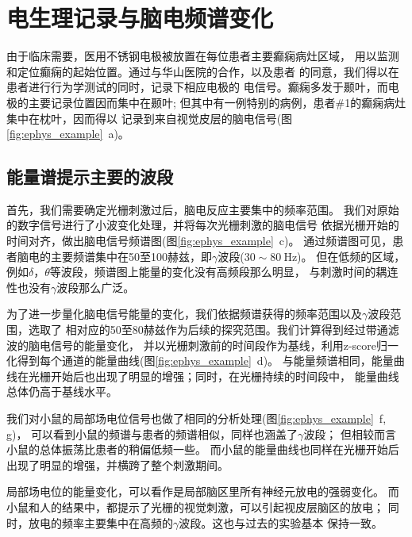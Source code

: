 
\section{电生理记录与脑电频谱变化}
由于临床需要，医用不锈钢电极被放置在每位患者主要癫痫病灶区域，
用以监测和定位癫痫的起始位置。通过与华山医院的合作，以及患者
的同意，我们得以在患者进行行为学测试的同时，记录下相应电极的
电信号。癫痫多发于颞叶，而电极的主要记录位置因而集中在颞叶;
但其中有一例特别的病例，患者\#1的癫痫病灶集中在枕叶，因而得以
记录到来自视觉皮层的脑电信号(图\ref{fig:ephys_example}~a)。

\subsection{能量谱提示主要的波段}
首先，我们需要确定光栅刺激过后，脑电反应主要集中的频率范围。
我们对原始的数字信号进行了小波变化处理，并将每次光栅刺激的脑电信号
依据光栅开始的时间对齐，做出脑电信号频谱图(图\ref{fig:ephys_example}~c)。
通过频谱图可见，患者脑电的主要频谱集中在50至100赫兹，即\(\gamma\)波段(\(30 \sim 80\ \text{Hz}\))。
但在低频的区域，例如\(\delta\)，\(\theta\)等波段，频谱图上能量的变化没有高频段那么明显，
与刺激时间的耦连性也没有\(\gamma\)波段那么广泛。

为了进一步量化脑电信号能量的变化，我们依据频谱获得的频率范围以及\(\gamma\)波段范围，选取了
相对应的50至80赫兹作为后续的探究范围。我们计算得到经过带通滤波的脑电信号的能量变化，
并以光栅刺激前的时间段作为基线，利用z-score归一化得到每个通道的能量曲线(图\ref{fig:ephys_example}~d)。
与能量频谱相同，能量曲线在光栅开始后也出现了明显的增强；同时，在光栅持续的时间段中，
能量曲线总体仍高于基线水平。

我们对小鼠的局部场电位信号也做了相同的分析处理(图\ref{fig:ephys_example}~f, g)，
可以看到小鼠的频谱与患者的频谱相似，同样也涵盖了\(\gamma\)波段；
但相较而言小鼠的总体振荡比患者的稍偏低频一些。
而小鼠的能量曲线也同样在光栅开始后出现了明显的增强，并横跨了整个刺激期间。

局部场电位的能量变化，可以看作是局部脑区里所有神经元放电的强弱变化。
而小鼠和人的结果中，都提示了光栅的视觉刺激，可以引起视皮层脑区的放电；
同时，放电的频率主要集中在高频的\(\gamma\)波段。这也与过去的实验基本
保持一致\cite{lima2011gamma,demiralp2007gamma}。

